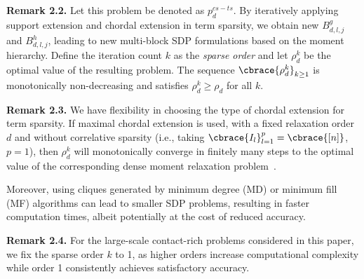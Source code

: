 \textbf{Remark 2.2.}
Let this problem be denoted as $p_d^{cs-ts}$. By iteratively applying support extension and chordal extension in term sparsity, we obtain new $B_{d,l,j}^g$ and $B_{d,l,j}^h$, leading to new multi-block SDP formulations based on the moment hierarchy. Define the iteration count $k$ as the \emph{sparse order} and let $\rho_d^k$ be the optimal value of the resulting problem. The sequence $\cbrace{\rho_d^k}_{k \geq 1}$ is monotonically non-decreasing and satisfies $\rho_d^k \geq \rho_d$ for all $k$.

\textbf{Remark 2.3.}
We have flexibility in choosing the type of chordal extension for term sparsity. If maximal chordal extension is used, with a fixed relaxation order $d$ and without correlative sparsity (i.e., taking $\cbrace{I_l}_{l=1}^p = \cbrace{[n]}$, $p=1$), then $\rho_d^k$ will monotonically converge in finitely many steps to the optimal value of the corresponding dense moment relaxation problem~\cite{wang2021siam-tssos}.

Moreover, using cliques generated by minimum degree (MD) or minimum fill (MF) algorithms can lead to smaller SDP problems, resulting in faster computation times, albeit potentially at the cost of reduced accuracy.

\textbf{Remark 2.4.}
For the large-scale contact-rich problems considered in this paper, we fix the sparse order $k$ to 1, as higher orders increase computational complexity while order 1 consistently achieves satisfactory accuracy.














